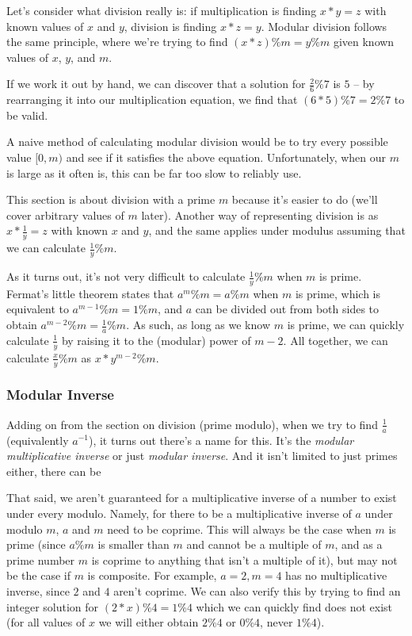 Let's consider what division really is: if multiplication is finding $x * y = z$ with known values of $x$ and $y$, division is finding $x * z = y$. Modular division follows the same principle, where we're trying to find $(x * z) \% m = y \% m$ given known values of $x$, $y$, and $m$.

If we work it out by hand, we can discover that a solution for $\frac{2}{6} \% 7$ is $5$ -- by rearranging it into our multiplication equation, we find that $(6 * 5) \% 7 = 2 \% 7$ to be valid.

A naive method of calculating modular division would be to try every possible value $[0, m)$ and see if it satisfies the above equation. Unfortunately, when our $m$ is large as it often is, this can be far too slow to reliably use.

This section is about division with a prime $m$ because it's easier to do (we'll cover arbitrary values of $m$ later). Another way of representing division is as $x * \frac{1}{y} = z$ with known $x$ and $y$, and the same applies under modulus assuming that we can calculate $\frac{1}{y} \% m$.

As it turns out, it's not very difficult to calculate $\frac{1}{y} \% m$ when $m$ is prime. Fermat's little theorem states that $a^m \% m = a \% m$ when $m$ is prime, which is equivalent to $a^{m-1} \% m = 1 \% m$, and $a$ can be divided out from both sides to obtain $a^{m-2} \% m = \frac{1}{a} \% m$. As such, as long as we know $m$ is prime, we can quickly calculate $\frac{1}{y}$ by raising it to the (modular) power of $m-2$. All together, we can calculate $\frac{x}{y} \% m$ as $x * y^{m-2} \% m$.

\subsubsection{Modular Inverse}

Adding on from the section on division (prime modulo), when we try to find $\frac{1}{a}$ (equivalently $a^{-1}$), it turns out there's a name for this. It's the \textit{modular multiplicative inverse} or just \textit{modular inverse}. And it isn't limited to just primes either, there can be 

That said, we aren't guaranteed for a multiplicative inverse of a number to exist under every modulo. Namely, for there to be a multiplicative inverse of $a$ under modulo $m$, $a$ and $m$ need to be coprime. This will always be the case when $m$ is prime (since $a \% m$ is smaller than $m$ and cannot be a multiple of $m$, and as a prime number $m$ is coprime to anything that isn't a multiple of it), but may not be the case if $m$ is composite. For example, $a = 2, m = 4$ has no multiplicative inverse, since $2$ and $4$ aren't coprime. We can also verify this by trying to find an integer solution for $(2 * x) \% 4 = 1 \% 4$ which we can quickly find does not exist (for all values of $x$ we will either obtain $2 \% 4$ or $0 \% 4$, never $1 \% 4$).

